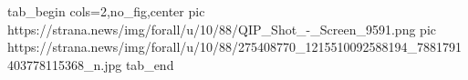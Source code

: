  
 
 
 
 


\ifcmt
  tab_begin cols=2,no_fig,center
     pic https://strana.news/img/forall/u/10/88/QIP_Shot_-_Screen_9591.png
		 pic https://strana.news/img/forall/u/10/88/275408770_1215510092588194_7881791403778115368_n.jpg
  tab_end
\fi
